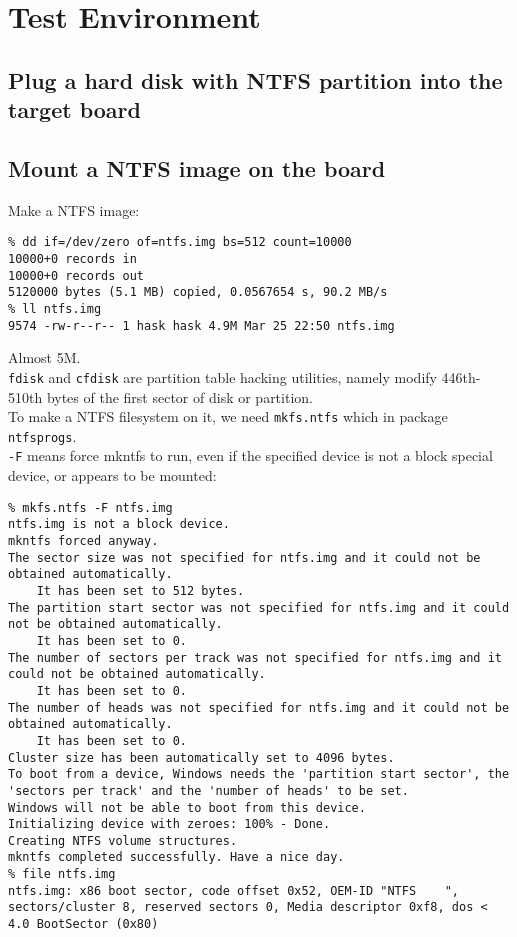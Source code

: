 \documentclass[a4paper]{report}
\begin{document}
\section{Test Environment}
\subsection{Plug a hard disk with NTFS partition into the target board}
\subsection{Mount a NTFS image on the board}
Make a NTFS image:
\begin{lstlisting}
% dd if=/dev/zero of=ntfs.img bs=512 count=10000   
10000+0 records in
10000+0 records out
5120000 bytes (5.1 MB) copied, 0.0567654 s, 90.2 MB/s
% ll ntfs.img                                     
9574 -rw-r--r-- 1 hask hask 4.9M Mar 25 22:50 ntfs.img
\end{lstlisting}
Almost 5M.\\
{\tt fdisk} and {\tt cfdisk} are partition table hacking utilities, namely modify 
446th-510th bytes of the first sector of disk or partition.\\
To make a NTFS filesystem on it, we need {\tt mkfs.ntfs} 
which in package {\tt ntfsprogs}.\\
{\tt -F} means force mkntfs to run, even if the specified device is 
not a block special device, or appears to be mounted:
\begin{lstlisting}
% mkfs.ntfs -F ntfs.img
ntfs.img is not a block device.
mkntfs forced anyway.
The sector size was not specified for ntfs.img and it could not be obtained automatically.  
    It has been set to 512 bytes.
The partition start sector was not specified for ntfs.img and it could not be obtained automatically.  
    It has been set to 0.
The number of sectors per track was not specified for ntfs.img and it could not be obtained automatically.  
    It has been set to 0.
The number of heads was not specified for ntfs.img and it could not be obtained automatically.  
    It has been set to 0.
Cluster size has been automatically set to 4096 bytes.
To boot from a device, Windows needs the 'partition start sector', the 'sectors per track' and the 'number of heads' to be set.
Windows will not be able to boot from this device.
Initializing device with zeroes: 100% - Done.
Creating NTFS volume structures.
mkntfs completed successfully. Have a nice day.
% file ntfs.img
ntfs.img: x86 boot sector, code offset 0x52, OEM-ID "NTFS    ", 
sectors/cluster 8, reserved sectors 0, Media descriptor 0xf8, dos < 4.0 BootSector (0x80)
\end{lstlisting}
\end{document}
